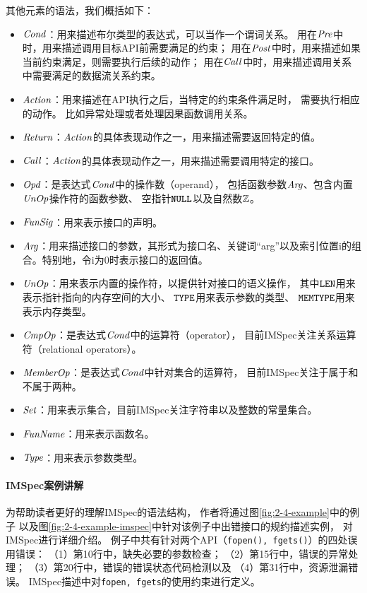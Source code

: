 

其他元素的语法，我们概括如下：
\begin{itemize}
	\item $\mathit{Cond}$：用来描述布尔类型的表达式，可以当作一个谓词关系。
	用在$\mathit{Pre}$中时，用来描述调用目标API前需要满足的约束；
	用在$\mathit{Post}$中时，用来描述如果当前约束满足，则需要执行后续的动作；
	用在$\mathit{Call}$中时，用来描述调用关系中需要满足的数据流关系约束。
	\item $\mathit{Action}$：用来描述在API执行之后，当特定的约束条件满足时，
	需要执行相应的动作。
	比如异常处理或者处理因果函数调用关系。
	\item $\mathit{Return}$：$\mathit{Action}$的具体表现动作之一，用来描述需要返回特定的值。
	\item $\mathit{Call}$：$\mathit{Action}$的具体表现动作之一，用来描述需要调用特定的接口。
	\item $\mathit{Opd}$：是表达式$\mathit{Cond}$中的操作数（operand），
	包括函数参数$\mathit{Arg}$、包含内置$\mathit{UnOp}$操作符的函数参数、
	空指针$\texttt{\textbf{NULL}}$以及自然数$\mathbb{Z}$。
	\item $\mathit{FunSig}$：用来表示接口的声明。
	\item $\mathit{Arg}$：用来描述接口的参数，其形式为接口名、关键词“arg”以及索引位置i的组合。特别地，令i为0时表示接口的返回值。
	\item $\mathit{UnOp}$：用来表示内置的操作符，以提供针对接口的语义操作，
	其中\textbf{$\texttt{LEN}$}用来表示指针指向的内存空间的大小、
	\textbf{$\texttt{TYPE}$}用来表示参数的类型、
	\textbf{$\texttt{MEMTYPE}$}用来表示内存类型。
	\item $\mathit{CmpOp}$：是表达式$\mathit{Cond}$中的运算符（operator），
	目前IMSpec关注关系运算符（relational operators）。
	\item $\mathit{MemberOp}$：是表达式$\mathit{Cond}$中针对集合的运算符，
	目前IMSpec关注于属于和不属于两种。
	\item $\mathit{Set}$：用来表示集合，目前IMSpec关注字符串以及整数的常量集合。
	\item $\mathit{FunName}$：用来表示函数名。
	\item $\mathit{Type}$：用来表示参数类型。
\end{itemize}



\paragraph{IMSpec案例讲解}
为帮助读者更好的理解IMSpec的语法结构，
作者将通过图\ref{fig:2-4-example}中的例子
以及图\ref{fig:2-4-example-imspec}中针对该例子中出错接口的规约描述实例，
对IMSpec进行详细介绍。
例子中共有针对两个API（\texttt{fopen(), fgets()}）的四处误用错误：
（1）第10行中，缺失必要的参数检查；
（2）第15行中，错误的异常处理；
（3）第20行中，错误的错误状态代码检测以及
（4）第31行中，资源泄漏错误。
IMSpec描述中对\texttt{fopen, fgets}的使用约束进行定义。

